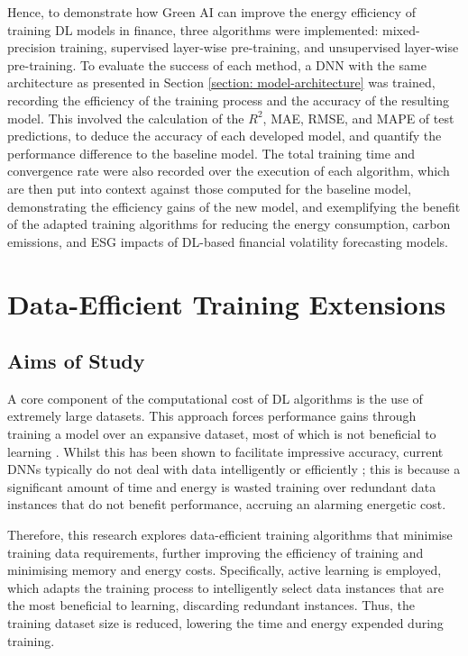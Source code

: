 \documentclass[a4paper, 11pt]{report}
\begin{document}
    Hence, to demonstrate how Green AI can improve the energy efficiency of training DL models in finance, three algorithms were implemented: mixed-precision training, supervised layer-wise pre-training, and unsupervised layer-wise pre-training. To evaluate the success of each method, a DNN with the same architecture as presented in Section \ref{section: model-architecture} was trained, recording the efficiency of the training process and the accuracy of the resulting model. This involved the calculation of the $R^2$, MAE, RMSE, and MAPE of test predictions, to deduce the accuracy of each developed model, and quantify the performance difference to the baseline model. The total training time and convergence rate were also recorded over the execution of each algorithm, which are then put into context against those computed for the baseline model, demonstrating the efficiency gains of the new model, and exemplifying the benefit of the adapted training algorithms for reducing the energy consumption, carbon emissions, and ESG impacts of DL-based financial volatility forecasting models.


    \section{Data-Efficient Training Extensions}
    \label{section: data-extensions}

    \subsection{Aims of Study}

    A core component of the computational cost of DL algorithms is the use of extremely large datasets. This approach forces performance gains through training a model over an expansive dataset, most of which is not beneficial to learning \citep{bender-2021}. Whilst this has been shown to facilitate impressive accuracy, current DNNs typically do not deal with data intelligently or efficiently \citep{aljarrah-2015}; this is because a significant amount of time and energy is wasted training over redundant data instances that do not benefit performance, accruing an alarming energetic cost.

    Therefore, this research explores data-efficient training algorithms that minimise training data requirements, further improving the efficiency of training and minimising memory and energy costs. Specifically, active learning is employed, which adapts the training process to intelligently select data instances that are the most beneficial to learning, discarding redundant instances. Thus, the training dataset size is reduced, lowering the time and energy expended during training. 
\end{document}
